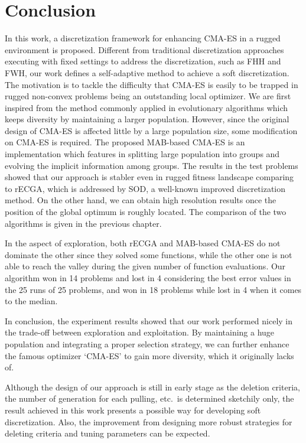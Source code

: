 \chapter{Conclusion} \label{ch:conclusion}

In this work, a discretization framework for enhancing CMA-ES in a
rugged environment is proposed.
Different from traditional discretization approaches executing with
fixed settings to address the discretization, such as FHH and FWH, our
work defines a self-adaptive method to achieve a soft discretization.
The motivation is to tackle the difficulty that CMA-ES is easily to be
trapped in rugged non-convex problems being an outstanding local
optimizer.
We are first inspired from the method commonly applied in evolutionary
algorithms which keeps diversity by maintaining a larger population.
However, since the original design of CMA-ES is affected little by a
large population size, some modification on CMA-ES is required.
The proposed MAB-based CMA-ES is an implementation which features in
splitting large population into groups and evolving the implicit
information among groups.
The results in the test problems showed that our approach is stabler
even in rugged fitness landscape comparing to rECGA, which is addressed
by SOD, a well-known improved discretization method.
On the other hand, we can obtain high resolution results once the
position of the global optimum is roughly located.
The comparison of the two algorithms is given in the previous chapter.

In the aspect of exploration, both rECGA and MAB-based CMA-ES do not
dominate the other since they solved some functions, while the other one
is not able to reach the valley during the given number of function
evaluations.
Our algorithm won in 14 problems and lost in 4 considering the best
error values in the 25 runs of 25 problems, and won in 18 problems while
lost in 4 when it comes to the median.

In conclusion, the experiment results showed that our work performed
nicely in the trade-off between exploration and exploitation.
By maintaining a huge population and integrating a proper selection strategy,
we can further enhance the famous optimizer `CMA-ES' to gain more
diversity, which it originally lacks of. 

Although the design of our approach is still in early stage as the
deletion criteria, the number of generation for each pulling, etc.\ is
determined sketchily only, the result achieved in this work presents a
possible way for developing soft discretization.
Also, the improvement from designing more robust strategies for
deleting criteria and tuning parameters can be expected.

